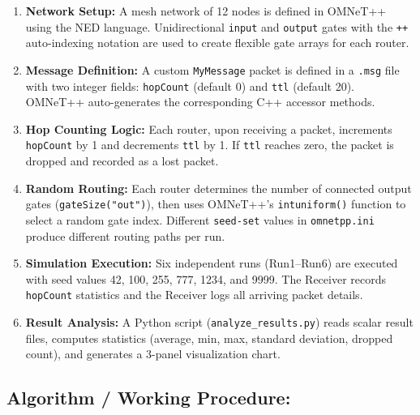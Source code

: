 \documentclass[12pt,a4paper]{article}
\begin{document}
\begin{enumerate}
  \item \textbf{Network Setup:} A mesh network of 12 nodes is defined in OMNeT++ using the NED language. Unidirectional \texttt{input} and \texttt{output} gates with the \texttt{++} auto-indexing notation are used to create flexible gate arrays for each router.

  \item \textbf{Message Definition:} A custom \texttt{MyMessage} packet is defined in a \texttt{.msg} file with two integer fields: \texttt{hopCount} (default 0) and \texttt{ttl} (default 20). OMNeT++ auto-generates the corresponding C++ accessor methods.

  \item \textbf{Hop Counting Logic:} Each router, upon receiving a packet, increments \texttt{hopCount} by 1 and decrements \texttt{ttl} by 1. If \texttt{ttl} reaches zero, the packet is dropped and recorded as a lost packet.

  \item \textbf{Random Routing:} Each router determines the number of connected output gates (\texttt{gateSize("out")}), then uses OMNeT++'s \texttt{intuniform()} function to select a random gate index. Different \texttt{seed-set} values in \texttt{omnetpp.ini} produce different routing paths per run.

  \item \textbf{Simulation Execution:} Six independent runs (Run1--Run6) are executed with seed values 42, 100, 255, 777, 1234, and 9999. The Receiver records \texttt{hopCount} statistics and the Receiver logs all arriving packet details.

  \item \textbf{Result Analysis:} A Python script (\texttt{analyze\_results.py}) reads scalar result files, computes statistics (average, min, max, standard deviation, dropped count), and generates a 3-panel visualization chart.
\end{enumerate}

\subsection{Algorithm / Working Procedure: }
\end{document}
